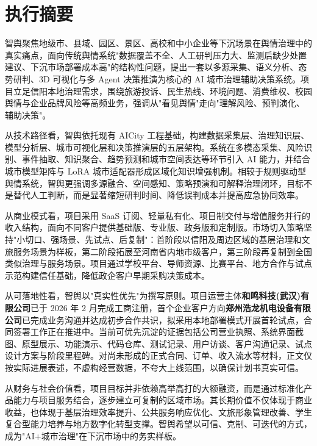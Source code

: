 \chapter*{执行摘要}

智舆聚焦地级市、县域、园区、景区、高校和中小企业等下沉场景在舆情治理中的真实痛点，面向传统舆情系统"数据覆盖不全、人工研判压力大、监测后缺少处置建议、下沉市场部署成本高"的结构性问题，提出一套以多源采集、语义分析、态势研判、3D 可视化与多 Agent 决策推演为核心的 AI 城市治理辅助决策系统。项目立足信阳本地治理需求，围绕旅游投诉、民生热线、环境问题、消费维权、校园舆情与企业品牌风险等高频业务，强调从"看见舆情"走向"理解风险、预判演化、辅助决策"。

从技术路径看，智舆依托现有 AICity 工程基础，构建数据采集层、治理知识层、模型分析层、城市可视化层和决策推演层的五层架构。系统在多模态采集、风险识别、事件抽取、知识聚合、趋势预测和城市空间表达等环节引入 AI 能力，并结合城市模型矩阵与 LoRA 城市适配器形成区域化知识增强机制。相较于规则驱动型舆情系统，智舆更强调多源融合、空间感知、策略预演和可解释治理闭环，目标不是替代人工判断，而是显著缩短研判时间、降低误判成本并提高应急协同效率。

从商业模式看，项目采用 SaaS 订阅、轻量私有化、项目制交付与增值服务并行的收入结构，面向不同客户提供基础版、专业版、政务版和定制版。市场切入策略坚持"小切口、强场景、先试点、后复制"：首阶段以信阳及周边区域的基层治理和文旅服务场景为样板，第二阶段拓展至河南省内地市级客户，第三阶段再复制到全国类似治理与服务场景。项目通过学校平台、导师资源、比赛平台、地方合作与试点示范构建信任基础，降低政企客户早期采购决策成本。

从可落地性看，智舆以"真实性优先"为撰写原则。项目运营主体\textbf{和鸣科技(武汉)有限公司}已于 2026 年 2 月完成工商注册，首个企业客户方向\textbf{郑州浩龙机电设备有限公司}已完成业务沟通并达成初步合作共识，拟采用本地部署模式开展首轮试点，合同签署工作正在推进中。当前可优先沉淀的证据包括公司营业执照、系统界面截图、原型展示、功能演示、代码仓库、测试记录、用户访谈、客户沟通记录、试点设计方案与阶段里程碑。对尚未形成的正式合同、订单、收入流水等材料，正文仅按实际进展表述，不虚构经营数据，不夸大上线范围，以确保计划书真实可信。

从财务与社会价值看，项目目标并非依赖高举高打的大额融资，而是通过标准化产品能力与项目服务结合，逐步建立可复制的区域市场。其长期价值不仅体现于商业收益，也体现于基层治理效率提升、公共服务响应优化、文旅形象管理改善、学生复合型能力培养与地方数字化转型支撑。智舆希望以可信、克制、可迭代的方式，成为"AI+城市治理"在下沉市场中的务实样板。
